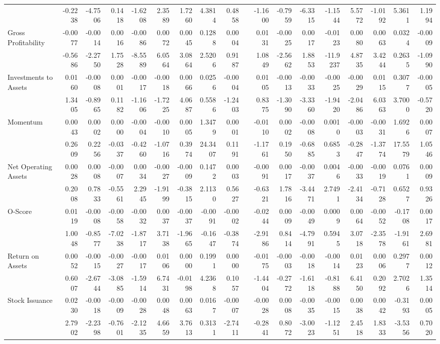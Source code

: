 \begin{sidewaystable}[htbp]
{\begin{tabular}{lrrrrrrrrrrrrrrrrr}
& -0.2238 & -4.7506 & 0.1418 & -1.6208 & 2.3589 & 1.7260 & 4.3814 & 0.4858 &       & -1.1600 & -0.7959 & -6.3315 & -1.1544 & 5.5772 & -1.0192 & 5.3611 & 1.1994 \\
Gross Profitability & -0.0077 & -0.0014 & 0.0016 & -0.0086 & 0.0072 & 0.0045 & 0.1288 & 0.0004 &       & 0.0131 & -0.0025 & 0.0017 & -0.0123 & 0.0080 & 0.0063 & 0.0324 & -0.0009 \\
& -0.5686 & -2.2750 & 1.7528 & -8.5589 & 6.0564 & 3.0864 & 2.5206 & 0.9187 &       & 1.0849 & -2.5662 & 1.8853 & -11.9237 & 4.8735 & 3.4244 & 0.2635 & -1.0990 \\
Investments to Assets & 0.0160 & -0.0008 & 0.0001 & -0.0017 & -0.0018 & 0.0066 & 0.0256 & -0.0004 &       & 0.0105 & -0.0013 & -0.0033 & -0.0025 & -0.0029 & 0.0115 & 0.3077 & -0.0005 \\
& 1.3405 & -0.8965 & 0.1182 & -1.1606 & -1.7225 & 4.0687 & 0.5586 & -1.2403 &       & 0.8375 & -1.3090 & -3.3360 & -1.9420 & -2.0486 & 6.0363 & 3.7000 & -0.5720 \\
Momentum & 0.0043 & 0.0002 & 0.0000 & -0.0004 & -0.0010 & 0.0005 & 1.3479 & 0.0001 &       & -0.0110 & 0.0002 & -0.0008 & 0.0010 & -0.0003 & -0.0031 & 1.6926 & 0.0007 \\
& 0.2609 & 0.2256 & -0.0337 & -0.4260 & -1.0716 & 0.3974 & 24.3407 & 0.1191 &       & -1.1761 & 0.1950 & -0.6885 & 0.6853 & -0.2847 & -1.3774 & 17.5579 & 1.0546 \\
Net Operating Assets & 0.0028 & 0.0008 & -0.0007 & 0.0034 & -0.0027 & -0.0009 & 0.1472 & 0.0003 &       & -0.0091 & 0.0017 & -0.0037 & 0.0046 & -0.0033 & -0.0019 & 0.0761 & 0.0009 \\
& 0.2008 & 0.7833 & -0.5561 & 2.2945 & -1.9199 & -0.3815 & 2.1130 & 0.5627 &       & -0.6321 & 1.7816 & -3.4471 & 2.7491 & -2.4134 & -0.7128 & 0.6527 & 0.9326 \\
O-Score & 0.0119 & -0.0008 & -0.0058 & -0.0032 & 0.0037 & -0.0037 & -0.0091 & -0.0002 &       & -0.0244 & 0.0009 & -0.0049 & 0.0009 & 0.0064 & -0.0052 & -0.1708 & 0.0017 \\
& 1.0048 & -0.8577 & -7.0238 & -1.8717 & 3.7138 & -1.9665 & -0.1647 & -0.3874 &       & -2.9186 & 0.8414 & -4.7991 & 0.5945 & 3.0718 & -2.3578 & -1.9161 & 2.6981 \\
Return on Assets & 0.0052 & -0.0015 & -0.0027 & -0.0017 & 0.0106 & 0.0000 & 0.1991 & 0.0000 &       & -0.0175 & -0.0003 & -0.0018 & -0.0014 & 0.0123 & 0.0006 & 0.2977 & 0.0012 \\
& 0.6007 & -2.6744 & -3.0885 & -1.5914 & 6.7431 & -0.0198 & 4.2368 & 0.1057 &       & -1.4404 & -0.2772 & -1.6118 & -0.8188 & 6.4150 & 0.2092 & 2.7026 & 1.3514 \\
Stock Issuance & 0.0230 & -0.0018 & -0.0009 & -0.0028 & 0.0048 & 0.0063 & 0.0167 & -0.0007 &       & -0.0028 & 0.0008 & -0.0035 & -0.0015 & 0.0038 & 0.0042 & -0.3193 & 0.0005 \\
& 2.7902 & -2.2398 & -0.7601 & -2.1235 & 4.6659 & 3.7613 & 0.3131 & -2.7411 &       & -0.2841 & 0.8072 & -3.0023 & -1.1251 & 2.4518 & 1.8333 & -3.5356 & 0.7020 \\
\bottomrule
\end{tabular}%
}
\label{tab:vol-ff6v}%
\end{sidewaystable}%
